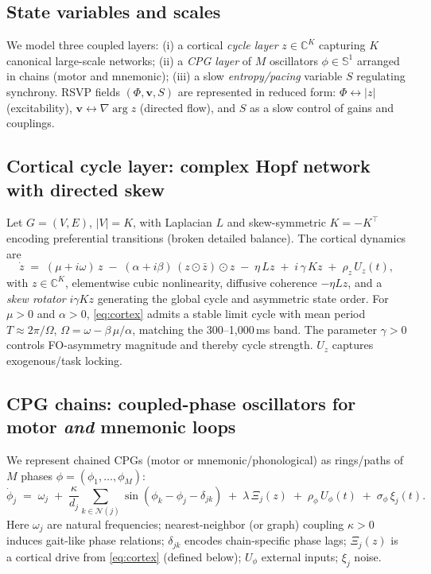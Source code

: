 \documentclass{article}
\begin{document}
\subsection{State variables and scales}
We model three coupled layers: (i) a cortical \emph{cycle layer} $z\in\mathbb{C}^K$ capturing $K$ canonical large-scale networks; (ii) a \emph{CPG layer} of $M$ oscillators $\phi\in\mathbb{S}^1$ arranged in chains (motor and mnemonic); (iii) a slow \emph{entropy/pacing} variable $S$ regulating synchrony. RSVP fields $(\Phi,\mathbf{v},S)$ are represented in reduced form: $\Phi\leftrightarrow |z|$ (excitability), $\mathbf{v}\leftrightarrow \nabla\arg z$ (directed flow), and $S$ as a slow control of gains and couplings.

\subsection{Cortical cycle layer: complex Hopf network with directed skew}
Let $G=(V,E)$, $|V|=K$, with Laplacian $L$ and skew-symmetric $K=-K^\top$ encoding preferential transitions (broken detailed balance). The cortical dynamics are
\begin{equation}
\dot z \;=\; (\mu + i\omega)\,z \;-\; (\alpha + i\beta)\,(z\odot\bar z)\odot z
\;-\; \eta\,L z \;+\; i\,\gamma\,K z \;+\; \rho_z\,U_z(t),
\label{eq:cortex}
\end{equation}
with $z\in\mathbb{C}^K$, elementwise cubic nonlinearity, diffusive coherence $-\eta L z$, and a \emph{skew rotator} $i\gamma K z$ generating the global cycle and asymmetric state order. For $\mu>0$ and $\alpha>0$, \eqref{eq:cortex} admits a stable limit cycle with mean period $T\approx 2\pi/\Omega$, $\Omega=\omega-\beta\,\mu/\alpha$, matching the 300--1{,}000\,ms band. The parameter $\gamma>0$ controls FO-asymmetry magnitude and thereby cycle strength. $U_z$ captures exogenous/task locking.

\subsection{CPG chains: coupled-phase oscillators for motor \emph{and} mnemonic loops}
We represent chained CPGs (motor or mnemonic/phonological) as rings/paths of $M$ phases $\phi=(\phi_1,\dots,\phi_M)$:
\begin{equation}
\dot\phi_j \;=\; \omega_j \;+\; \frac{\kappa}{d_j}\!\sum_{k\in\mathcal{N}(j)}\!\sin(\phi_k-\phi_j-\delta_{jk})
\;+\; \lambda\,\Xi_j(z) \;+\; \rho_\phi\,U_\phi(t) \;+\; \sigma_\phi\,\xi_j(t).
\label{eq:cpg}
\end{equation}
Here $\omega_j$ are natural frequencies; nearest-neighbor (or graph) coupling $\kappa>0$ induces gait-like phase relations; $\delta_{jk}$ encodes chain-specific phase lags; $\Xi_j(z)$ is a cortical drive from \eqref{eq:cortex} (defined below); $U_\phi$ external inputs; $\xi_j$ noise.
\end{document}

